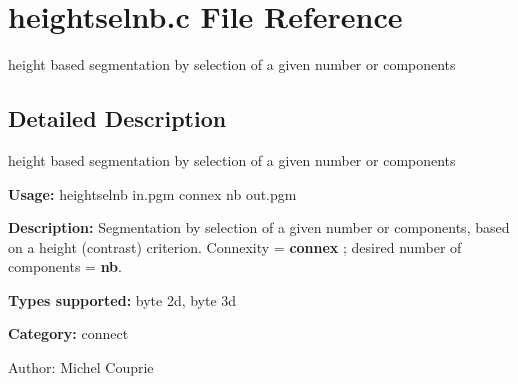 \section{heightselnb.c File Reference}
\label{heightselnb_8c}
height based segmentation by selection of a given number or components  




\label{_details}
\subsection{Detailed Description}
height based segmentation by selection of a given number or components 

{\bf Usage:} heightselnb in.pgm connex nb out.pgm

{\bf Description:} Segmentation by selection of a given number or components, based on a height (contrast) criterion. Connexity = {\bf connex} ; desired number of components = {\bf nb}.

{\bf Types supported:} byte 2d, byte 3d

{\bf Category:} connect

\begin{Desc}
\item[Author:]Michel Couprie \end{Desc}
